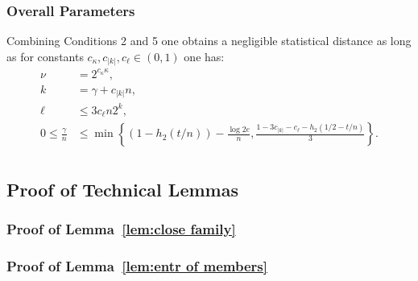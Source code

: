 \subsubsection{Overall Parameters}
Combining Conditions 2 and 5 one obtains a negligible statistical distance as long as for constants $c_\kappa, c_{|k|}, c_{\ell}\in (0,1)$ one has:
\begin{align*}
\nu &= 2^{c_{\kappa}\kappa},\\
k &=\gamma + c_{|k|}n,\\
\ell&\le 3c_{\ell}n2^k,\\
0\le \frac{\gamma}{n} &\le \min\left\{(1-h_2(t/n)) - \frac{\log{2e}}{n}, \frac{1-3c_{|k|} - c_{\ell}-h_2(1/2-t/n)}{3}\right\}.\\
\end{align*}
%
%

\subsection{Proof of Technical Lemmas}
\label{sec:tech lemmas}
\subsubsection{Proof of Lemma~\ref{lem:close family}}



\subsubsection{Proof of Lemma~\ref{lem:entr of members}}

